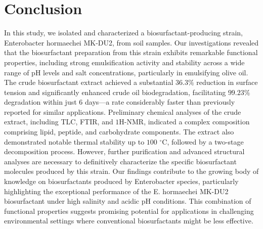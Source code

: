 \documentclass{svjour3}
\begin{document}
\section{Conclusion}
In this study, we isolated and characterized a biosurfactant-producing strain, Enterobacter hormaechei MK-DU2, from soil samples. Our investigations revealed that the biosurfactant preparation from this strain exhibits remarkable functional properties, including strong emulsification activity and stability across a wide range of pH levels and salt concentrations, particularly in emulsifying olive oil. The crude biosurfactant extract achieved a substantial $36.3\%$ reduction in surface tension and significantly enhanced crude oil biodegradation, facilitating $99.23\%$ degradation within just $6$ days—a rate considerably faster than previously reported for similar applications.
Preliminary chemical analyses of the crude extract, including TLC, FTIR, and $1$H-NMR, indicated a complex composition comprising lipid, peptide, and carbohydrate components. The extract also demonstrated notable thermal stability up to $100$ $^\circ$C, followed by a two-stage decomposition process. However, further purification and advanced structural analyses are necessary to definitively characterize the specific biosurfactant molecules produced by this strain. Our findings contribute to the growing body of knowledge on biosurfactants produced by Enterobacter species, particularly highlighting the exceptional performance of the E. hormaechei MK-DU2 biosurfactant under high salinity and acidic pH conditions. This combination of functional properties suggests promising potential for applications in challenging environmental settings where conventional biosurfactants might be less effective.
\end{document}
